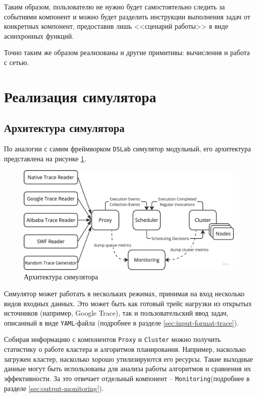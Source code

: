 Таким образом, пользователю не нужно будет самостоятельно следить за событиями компонент и можно будет разделить инструкции выполнения задач от конкретных компонент, предоставив лишь <<сценарий работы>> в виде асинхронных функций. 

Точно таким же образом реализованы и другие примитивы: вычисления и  работа с сетью. 


\section{Реализация симулятора}\label{sec:main-impl}


\subsection{Архитектура симулятора}

По аналогии с самим фреймворком \texttt{DSLab} симулятор модульный, его архитектура представлена на рисунке \ref{fig:arch}.

\begin{figure}[h!]
    \centering 
    \includegraphics[width=\textwidth]{images/simulator_arc}
    \caption{Архитектура симулятора}
    \label{fig:arch}
\end{figure}

Симулятор может работать в нескольких режимах, принимая на вход несколько видов входных данных. Это может быть как готовый трейс нагрузки из открытых источников (например, Google Trace), так и пользовательский ввод задач, описанный в виде \texttt{YAML}-файла (подробнее в разделе \ref{sec:input-format-trace}).

Собирая информацию с компонентов \texttt{Proxy} и \texttt{Cluster} можно получить статистику о работе кластера и алгоритмов планирования. Например, насколько загружен кластер, насколько хорошо утилизируются его ресурсы. Такие выходные данные могут быть использованы для анализа работы алгоритмов и сравнения их эффективности. За это отвечает отдельный компонент -- \texttt{Monitoring}(подробнее в разделе \ref{sec:output-monitoring}).


